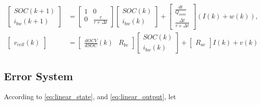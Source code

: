 \documentclass[11pt, a4paper]{article}
\theoremstyle{definition}
\theoremstyle{remark}
\begin{document}
\begin{align}
    \begin{bmatrix}
        SOC(k+1) \\
        i_{bw}(k+1)
    \end{bmatrix}
    &= 
    \begin{bmatrix}
        1 & 0 \\
        0 & \frac{\tau}{\tau+\Delta t}
    \end{bmatrix}
    \begin{bmatrix}
        SOC(k) \\
        i_{bw}(k)
    \end{bmatrix}
    +
    \begin{bmatrix}
        \frac{dt}{Q_{nom}}\\
        \frac{\Delta t}{\tau + \Delta t}
    \end{bmatrix}
    (I(k)+w(k)), \label{eq:linear_state} \\
    \begin{bmatrix}
        v_{cell}(k)
    \end{bmatrix}
    &=
    \begin{bmatrix}
        \frac{dOCV}{dSOC}(k) & R_{bv}
    \end{bmatrix}
    \begin{bmatrix}
        SOC(k) \\
        i_{bw}(k)
    \end{bmatrix}
    +
    \begin{bmatrix}
    R_{ac}
    \end{bmatrix}
    I(k)
    +
    v(k) \label{eq:linear_output}
\end{align}

\subsection{Error System}


According to \eqref{eq:linear_state}, and \eqref{eq:linear_output}, let
\end{document}
